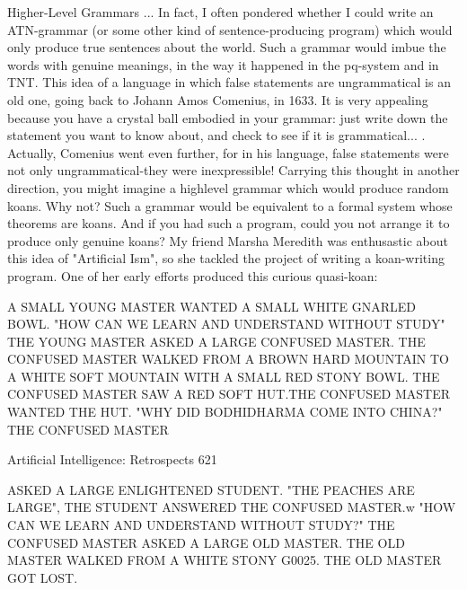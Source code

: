 {                             Higher-Level Grammars ...
In fact, I often pondered whether I could write an ATN-grammar (or some other kind of
sentence-producing program) which would only produce true sentences about the world.
Such a grammar would imbue the words with genuine meanings, in the way it happened
in the pq-system and in TNT. This idea of a language in which false statements are
ungrammatical is an old one, going back to Johann Amos Comenius, in 1633. It is very
appealing because you have a crystal ball embodied in your grammar: just write down the
statement you want to know about, and check to see if it is grammatical... . Actually,
Comenius went even further, for in his language, false statements were not only
ungrammatical-they were inexpressible!
        Carrying this thought in another direction, you might imagine a highlevel
grammar which would produce random koans. Why not? Such a grammar would be
equivalent to a formal system whose theorems are koans. And if you had such a program,
could you not arrange it to produce only genuine koans? My friend Marsha Meredith was
enthusastic about this idea of "Artificial Ism", so she tackled the project of writing a
koan-writing program. One of her early efforts produced this curious quasi-koan:

   A SMALL YOUNG MASTER WANTED A SMALL WHITE GNARLED
   BOWL. "HOW CAN WE LEARN AND UNDERSTAND WITHOUT STUDY"
   THE YOUNG MASTER ASKED A LARGE CONFUSED MASTER. THE
   CONFUSED MASTER WALKED FROM A BROWN HARD MOUNTAIN TO A
   WHITE SOFT MOUNTAIN WITH A SMALL RED STONY BOWL. THE
   CONFUSED MASTER SAW A RED SOFT HUT.THE CONFUSED MASTER
   WANTED THE HUT. "WHY DID BODHIDHARMA COME INTO CHINA?"
   THE CONFUSED MASTER




Artificial Intelligence: Retrospects                                                    621

   ASKED A LARGE ENLIGHTENED STUDENT. "THE PEACHES ARE
   LARGE", THE STUDENT ANSWERED THE CONFUSED MASTER.w "HOW
   CAN WE LEARN AND UNDERSTAND WITHOUT STUDY?" THE
   CONFUSED MASTER ASKED A LARGE OLD MASTER. THE OLD MASTER
   WALKED FROM A WHITE STONY G0025. THE OLD MASTER GOT LOST.

}
